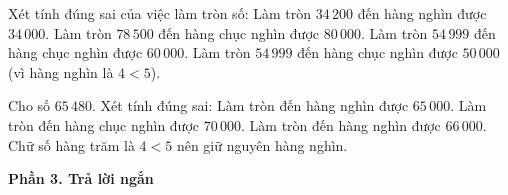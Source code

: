 \begin{ex} %
Xét tính đúng sai của việc làm tròn số:
\choiceTF
{\True Làm tròn $34\,200$ đến hàng nghìn được $34\,000$.}
{\True Làm tròn $78\,500$ đến hàng chục nghìn được $80\,000$.}
{Làm tròn $54\,999$ đến hàng chục nghìn được $60\,000$.}
{\True Làm tròn $54\,999$ đến hàng chục nghìn được $50\,000$ (vì hàng nghìn là $4 < 5$).}
\end{ex}

\begin{ex} %
Cho số $65\,480$. Xét tính đúng sai:
\choiceTF
{\True Làm tròn đến hàng nghìn được $65\,000$.}
{\True Làm tròn đến hàng chục nghìn được $70\,000$.}
{Làm tròn đến hàng nghìn được $66\,000$.}
{\True Chữ số hàng trăm là $4 < 5$ nên giữ nguyên hàng nghìn.}
\end{ex}

\textbf{Phần 3. Trả lời ngắn}

